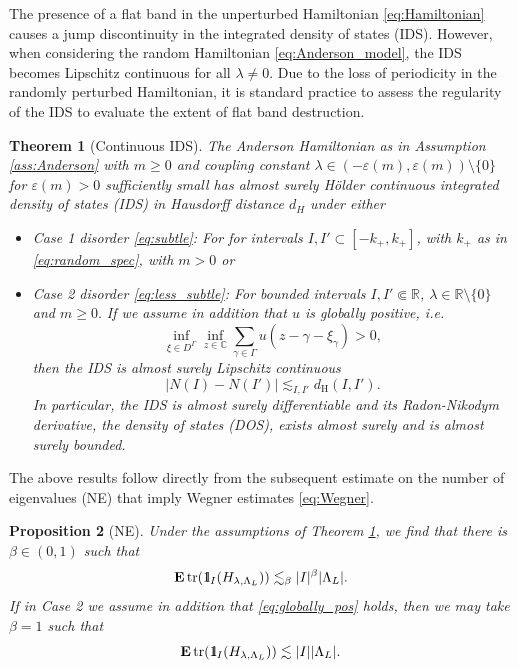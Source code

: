 \documentclass[reqno,12pt,letterpaper]{amsart}
\newcommand{\RR}{{\mathbb R}}
\newcommand{\CC}{{\mathbb C}}
\newtheorem{theo}{Theorem}
\newtheorem{prop}[theo]{Proposition}
\numberwithin{equation}{section}
\DeclareMathOperator{\tr}{tr}
\def\indic{\operatorname{1\hskip-2.75pt\relax l}}
\begin{document}
The presence of a flat band in the unperturbed Hamiltonian \eqref{eq:Hamiltonian} causes a jump discontinuity in the integrated density of states (IDS). However, when considering the random Hamiltonian \eqref{eq:Anderson_model}, the IDS becomes Lipschitz continuous for all $\lambda \neq 0$. 
Due to the loss of periodicity in the randomly perturbed Hamiltonian, it is standard practice to assess the regularity of the IDS to evaluate the extent of flat band destruction.
  \begin{theo}[Continuous IDS]
  \label{theo:continuity}
The Anderson Hamiltonian as in Assumption \eqref{ass:Anderson} with $m \ge 0$ and coupling constant $\lambda \in (-\varepsilon(m),\varepsilon(m)) \setminus\{0\}$ for $\varepsilon(m) >0$ sufficiently small has almost surely H\"older continuous integrated density of states (IDS) in Hausdorff distance $d_H$ under either
\begin{itemize}
\item \emph{Case 1 disorder }\eqref{eq:subtle}: For for intervals $I,I' \subset [-k_+,k_+]$, with $k_+$ as in \eqref{eq:random_spec}, with $m >0$ or
\item \emph{Case 2 disorder }\eqref{eq:less_subtle}: For bounded intervals $I,I' \Subset \RR$, $\lambda \in \RR\setminus \{0\}$ and $m \ge 0.$ If we assume in addition that $u$ is globally positive, i.e.
\begin{equation}
\label{eq:globally_pos}
 \inf_{\xi \in D^{\Gamma}} \inf_{z \in \CC} \sum_{\gamma \in \Gamma} u(z-\gamma-\xi_{\gamma}) >0,
 \end{equation}  
 then the IDS is almost surely Lipschitz continuous
\[ \vert N(I) - N(I')\vert \lesssim_{ I,I'} d_{\text{H}}(I,I').\]
In particular, the IDS is almost surely differentiable and its Radon-Nikodym derivative, the density of states (DOS), exists almost surely and is almost surely bounded.
 \end{itemize} 
 

 \end{theo}
 The above results follow directly from the subsequent estimate on the number of eigenvalues (NE) that imply Wegner estimates \eqref{eq:Wegner}. 
 \begin{prop}[NE]
 \label{prop:Wegner}
 Under the assumptions of Theorem \ref{theo:continuity}, we find that there is $\beta \in (0,1)$ such that
\[\mathbf E \tr(\indic_{I}(H_{\lambda,\Lambda_L})) \lesssim_{\beta} \vert  I \vert^{\beta} \vert \Lambda_L \vert.\]
If in Case 2 we assume in addition that \eqref{eq:globally_pos} holds, then we may take $\beta=1$ such that
\[ \mathbf E \tr(\indic_{I}(H_{\lambda,\Lambda_L})) \lesssim \vert I \vert \vert \Lambda_L \vert. \]
\end{prop}
\end{document}
